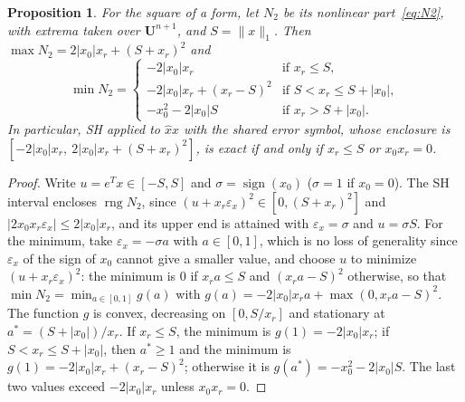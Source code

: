 \documentclass[10pt]{article}
\newtheorem{propo}{Proposition}
\theoremstyle{definition}
\newcommand{\U}{\mathbf{U}}
\newcommand{\eps}{\varepsilon}
\newcommand{\ex}{\eps_x}
\newcommand{\rng}{\operatorname{rng}}
\begin{document}
\begin{propo}
\label{prop:square}
For the square of a form, let $N_2$ be its nonlinear part~\eqref{eq:N2}, with extrema taken over $\U^{n+1}$, and $S=\|x\|_1$. Then $\max N_2=2|x_0|x_r+(S+x_r)^2$ and
\[
\min N_2=\begin{cases}-2|x_0|x_r & \text{if } x_r\le S,\\ -2|x_0|x_r+(x_r-S)^2 & \text{if } S<x_r\le S+|x_0|,\\ -x_0^2-2|x_0|S & \text{if } x_r>S+|x_0|.\end{cases}
\]
In particular, SH applied to $\hat x\hat x$ with the shared error symbol, whose enclosure is $[-2|x_0|x_r,\ 2|x_0|x_r+(S+x_r)^2]$, is exact if and only if $x_r\le S$ or $x_0x_r=0$.
\end{propo}
\begin{proof}
Write $u=e^Tx\in[-S,S]$ and $\sigma=\operatorname{sign}(x_0)$ ($\sigma=1$ if $x_0=0$). The SH interval encloses $\rng N_2$, since $(u+x_r\ex)^2\in[0,(S+x_r)^2]$ and $|2x_0x_r\ex|\le2|x_0|x_r$, and its upper end is attained with $\ex=\sigma$ and $u=\sigma S$. For the minimum, take $\ex=-\sigma a$ with $a\in[0,1]$, which is no loss of generality since $\ex$ of the sign of $x_0$ cannot give a smaller value, and choose $u$ to minimize $(u+x_r\ex)^2$: the minimum is $0$ if $x_ra\le S$ and $(x_ra-S)^2$ otherwise, so that $\min N_2=\min_{a\in[0,1]}g(a)$ with $g(a)=-2|x_0|x_ra+\max(0,x_ra-S)^2$. The function $g$ is convex, decreasing on $[0,S/x_r]$ and stationary at $a^*=(S+|x_0|)/x_r$. If $x_r\le S$, the minimum is $g(1)=-2|x_0|x_r$; if $S<x_r\le S+|x_0|$, then $a^*\ge1$ and the minimum is $g(1)=-2|x_0|x_r+(x_r-S)^2$; otherwise it is $g(a^*)=-x_0^2-2|x_0|S$. The last two values exceed $-2|x_0|x_r$ unless $x_0x_r=0$.
\end{proof}
\end{document}
